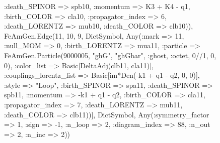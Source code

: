 \documentclass{revtex4}
\begin{document}
\begin{figure}[!htb]
\begin{center}
{:death_SPINOR => spb10, :momentum => K3 + K4 - q1, :birth_COLOR => cla10, :propagator_index => 6, :death_LORENTZ => mub10, :death_COLOR => clb10)), FeAmGen.Edge(11, 10, 9, Dict{Symbol, Any}(:mark => 11, :null_MOM => 0, :birth_LORENTZ => mua11, :particle => FeAmGen.Particle(9000005, "ghG", "ghGbar", :ghost, :octet, 0//1, 0, 0), :color_list => Basic[DeltaAdj(clb11, cla11)], :couplings_lorentz_list => Basic[im*Den(-k1 + q1 - q2, 0, 0)], :style => "Loop", :birth_SPINOR => spa11, :death_SPINOR => spb11, :momentum => -k1 + q1 - q2, :birth_COLOR => cla11, :propagator_index => 7, :death_LORENTZ => mub11, :death_COLOR => clb11))], Dict{Symbol, Any}(:symmetry_factor => 1, :sign => -1, :n_loop => 2, :diagram_index => 88, :n_out => 2, :n_inc => 2)) 
}
\end{center}
\end{figure}
\end{document}
